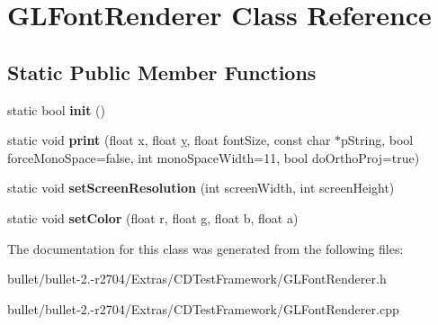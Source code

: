 \hypertarget{class_g_l_font_renderer}{\section{G\+L\+Font\+Renderer Class Reference}
\label{class_g_l_font_renderer}
}
\subsection*{Static Public Member Functions}
\begin{DoxyCompactItemize}
\item 
\hypertarget{class_g_l_font_renderer_af377f24607856b525253672dd32ae604}{static bool {\bfseries init} ()}\label{class_g_l_font_renderer_af377f24607856b525253672dd32ae604}

\item 
\hypertarget{class_g_l_font_renderer_ab369d710b72ef85b588ff2f5d09ff804}{static void {\bfseries print} (float x, float \hyperlink{_ice_utils_8h_aa7ffaed69623192258fb8679569ff9ba}{y}, float font\+Size, const char $\ast$p\+String, bool force\+Mono\+Space=false, int mono\+Space\+Width=11, bool do\+Ortho\+Proj=true)}\label{class_g_l_font_renderer_ab369d710b72ef85b588ff2f5d09ff804}

\item 
\hypertarget{class_g_l_font_renderer_a561c1f6b91f7b0048dd176ef9b25c6c0}{static void {\bfseries set\+Screen\+Resolution} (int screen\+Width, int screen\+Height)}\label{class_g_l_font_renderer_a561c1f6b91f7b0048dd176ef9b25c6c0}

\item 
\hypertarget{class_g_l_font_renderer_a15a18fcdc69ac702e787fad1948dadbe}{static void {\bfseries set\+Color} (float r, float g, float b, float a)}\label{class_g_l_font_renderer_a15a18fcdc69ac702e787fad1948dadbe}

\end{DoxyCompactItemize}


The documentation for this class was generated from the following files\+:\begin{DoxyCompactItemize}
\item 
bullet/bullet-\/2.-\/r2704/\+Extras/\+C\+D\+Test\+Framework/G\+L\+Font\+Renderer.\+h\item 
bullet/bullet-\/2.-\/r2704/\+Extras/\+C\+D\+Test\+Framework/G\+L\+Font\+Renderer.\+cpp\end{DoxyCompactItemize}
